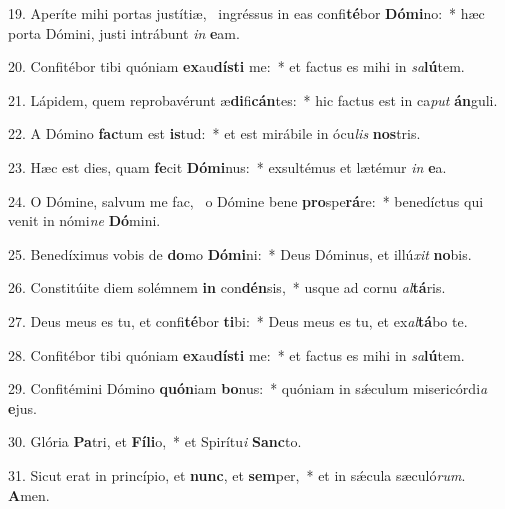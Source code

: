 19. Aperíte mihi portas justítiæ, \dag\  ingréssus in eas confi\textbf{té}bor \textbf{Dó}\textbf{mi}no:~*  hæc porta Dómini, justi intrábunt \textit{in} \textbf{e}am.\

20. Confitébor tibi quóniam \textbf{ex}au\textbf{dís}\textbf{ti} me:~*  et factus es mihi in \textit{sa}\textbf{lú}tem.\

21. Lápidem, quem reprobavérunt æ\textbf{di}fi\textbf{cán}tes:~*  hic factus est in ca\textit{put} \textbf{án}guli.\

22. A Dómino \textbf{fac}tum est \textbf{is}tud:~*  et est mirábile in ócu\textit{lis} \textbf{nos}tris.\

23. Hæc est dies, quam \textbf{fe}cit \textbf{Dó}\textbf{mi}nus:~*  exsultémus et lætémur \textit{in} \textbf{e}a.\

24. O Dómine, salvum me fac, \dag\  o Dómine bene \textbf{pro}spe\textbf{rá}re:~*  benedíctus qui venit in nómi\textit{ne} \textbf{Dó}mini.\

25. Benedíximus vobis de \textbf{do}mo \textbf{Dó}\textbf{mi}ni:~*  Deus Dóminus, et illú\textit{xit} \textbf{no}bis.\

26. Constitúite diem solémnem \textbf{in} con\textbf{dén}sis,~*  usque ad cornu \textit{al}\textbf{tá}ris.\

27. Deus meus es tu, et confi\textbf{té}bor \textbf{ti}bi:~*  Deus meus es tu, et ex\textit{al}\textbf{tá}bo te.\

28. Confitébor tibi quóniam \textbf{ex}au\textbf{dís}\textbf{ti} me:~*  et factus es mihi in \textit{sa}\textbf{lú}tem.\

29. Confitémini Dómino \textbf{quón}iam \textbf{bo}nus:~*  quóniam in sǽculum misericórdi\textit{a} \textbf{e}jus.\

30. Glória \textbf{Pa}tri, et \textbf{Fí}\textbf{li}o,~*  et Spirítu\textit{i} \textbf{Sanc}to.\

31. Sicut erat in princípio, et \textbf{nunc}, et \textbf{sem}per,~*  et in sǽcula sæculó\textit{rum}. \textbf{A}men.\

